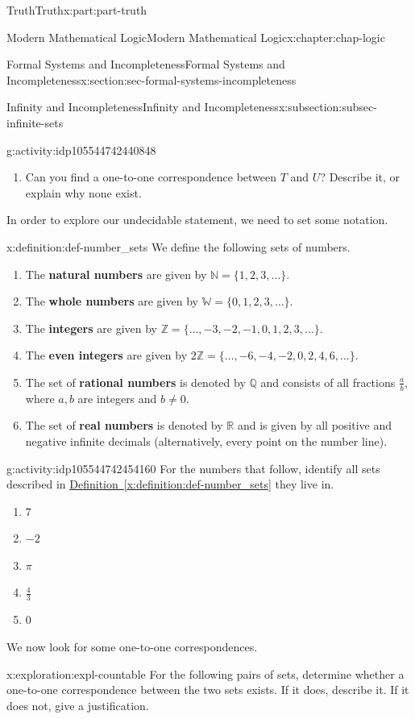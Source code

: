 \documentclass[oneside,10pt,]{book}
\newcommand{\xreffont}{\relax}
\newcommand{\terminology}[1]{\textbf{#1}}
\numberwithin{equation}{section}
\begin{document}
\begin{partptx}{Truth}{}{Truth}{}{}{x:part:part-truth}
\begin{chapterptx}{Modern Mathematical Logic}{}{Modern Mathematical Logic}{}{}{x:chapter:chap-logic}
\begin{sectionptx}{Formal Systems and Incompleteness}{}{Formal Systems and Incompleteness}{}{}{x:section:sec-formal-systems-incompleteness}
\begin{subsectionptx}{Infinity and Incompleteness}{}{Infinity and Incompleteness}{}{}{x:subsection:subsec-infinite-sets}
\begin{activity}{}{g:activity:idp105544742440848}
\begin{enumerate}
\item{}Can you find a one-to-one correspondence between \(T\) and \(U\)? Describe it, or explain why none exist.%
\end{enumerate}
\end{activity}%
In order to explore our undecidable statement, we need to set some notation.%
\begin{definition}{}{x:definition:def-number_sets}%
We define the following sets of numbers.%
%
\begin{enumerate}
\item{}The \terminology{natural numbers} are given by \(\mathbb{N} = \{1, 2, 3, \ldots\}\).%
\item{}The \terminology{whole numbers} are given by \(\mathbb{W} = \{0,1,2,3,\ldots\}\).%
\item{}The \terminology{integers} are given by \(\mathbb{Z} = \{\ldots, -3, -2, -1, 0, 1, 2, 3, \ldots\}\).%
\item{}The \terminology{even integers} are given by \(2\mathbb{Z} = \{\ldots, -6, -4, -2, 0, 2, 4, 6, \ldots\}\).%
\item{}The set of \terminology{rational numbers} is denoted by \(\mathbb{Q}\) and consists of all fractions \(\frac{a}{b}\), where \(a,b\) are integers and \(b\ne 0\).%
\item{}The set of \terminology{real numbers} is denoted by \(\mathbb{R}\) and is given by all positive and negative infinite decimals (alternatively, every point on the number line).%
\end{enumerate}
\end{definition}
\begin{activity}{}{g:activity:idp105544742454160}%
For the numbers that follow, identify all sets described in \hyperref[x:definition:def-number_sets]{Definition~{\xreffont\ref{x:definition:def-number_sets}}} they live in.%
%
\begin{enumerate}
\item{}\(\displaystyle 7\)%
\item{}\(\displaystyle -2\)%
\item{}\(\displaystyle \pi\)%
\item{}\(\displaystyle \frac{4}{3}\)%
\item{}\(\displaystyle 0\)%
\end{enumerate}
\end{activity}%
We now look for some one-to-one correspondences.%
\begin{exploration}{}{x:exploration:expl-countable}%
For the following pairs of sets, determine whether a one-to-one correspondence between the two sets exists. If it does, describe it. If it does not, give a justification.%

\end{exploration}
\end{subsectionptx}
\end{sectionptx}
\end{chapterptx}
\end{partptx}
\end{document}

